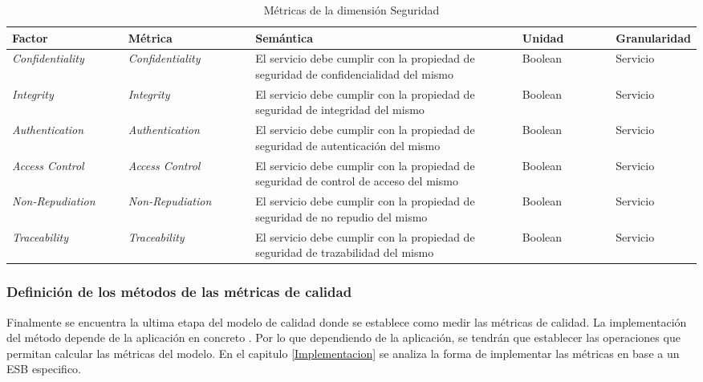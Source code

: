  \begin{table}[h]
  \centering
    \begin{tabular}{ |p{0.18\linewidth} | p{0.20\linewidth} | p{0.45\linewidth} | p{0.15\linewidth} | p{0.20\linewidth}|} 
    \hline
     \textbf{Factor} & \textbf{Métrica} & \textbf{Semántica}  & \textbf{Unidad}  & \textbf{Granularidad}  \\
      \hline
       \hline
       \emph{Confidentiality} &  \emph{Confidentiality} & El servicio debe cumplir con la propiedad de seguridad de confidencialidad del mismo & Boolean & Servicio \\
       \hline
       \emph{Integrity} &  \emph{Integrity} & El servicio debe cumplir con la propiedad de seguridad de integridad del mismo & Boolean & Servicio \\
       \hline
       \emph{Authentication} &  \emph{Authentication} & El servicio debe cumplir con la propiedad de seguridad de autenticación del mismo & Boolean & Servicio \\
       \hline
       \emph{Access Control} &  \emph{Access Control} & El servicio debe cumplir con la propiedad de seguridad de control de acceso del mismo & Boolean & Servicio \\
       \hline
       \emph{Non-Repudiation} &  \emph{Non-Repudiation} &El servicio debe cumplir con la propiedad de seguridad de no repudio del mismo & Boolean & Servicio \\
        \hline
   \emph{Traceability} &  \emph{Traceability} & El servicio debe cumplir con la propiedad de seguridad de trazabilidad del mismo  & Boolean & Servicio \\
      \hline
    \end{tabular}
    \caption{Métricas de la dimensión Seguridad}
    \label{tabla:definicion_metricas_seguridad}
  \end{table}

\subsubsection{Definición de los métodos de las métricas de calidad}
Finalmente se encuentra la ultima etapa del modelo de calidad donde se establece como medir las métricas de calidad. La implementación del método depende de la aplicación en concreto \cite{Calidad:CursoCalidad}. Por lo que dependiendo de la aplicación, se tendrán que establecer las operaciones que permitan calcular las métricas del modelo. En el capitulo \ref{Implementacion} se analiza la forma de implementar las métricas en base a un ESB especifico.